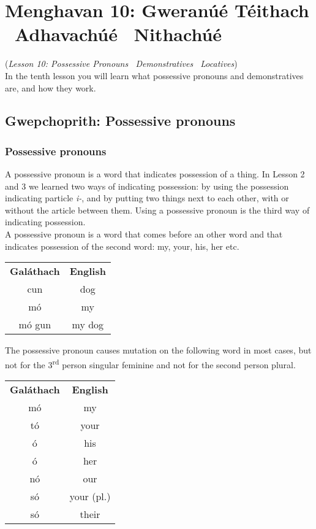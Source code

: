\section{Menghavan 10: Gweran\'{u}\'{e} T\'{e}ithach \textemdash\ Adhavach\'{u}\'{e} \textendash\ Nithach\'{u}\'{e}}
(\textit{Lesson 10: Possessive Pronouns \textemdash\ Demonstratives \textendash\ Locatives})\\

In the tenth lesson you will learn what possessive pronouns and demonstratives are, and how they work.

\subsection{Gwepchoprith: Possessive pronouns}
\subsubsection{Possessive pronouns}

A possessive pronoun is a word that indicates possession of a thing. In Lesson 2 and 3 we learned two ways of indicating possession: by using the possession indicating particle \textit{i-}, and by putting two things next to each other, with or without the article between them. Using a possessive pronoun is the third way of indicating possession.\\

A possessive pronoun is a word that comes before an other word and that indicates possession of the second word: my, your, his, her etc.
\begin{table}[H]
\centering
\begin{tabular}{cc}
  \toprule
  \textbf{Gal\'{a}thach} & \textbf{English}\\
  \cmidrule(lr){1-1}\cmidrule(lr){2-2}
  cun & dog\\
  m\'{o} & my\\
  m\'{o} gun & my dog\\
  \bottomrule
\end{tabular}
\label{examples_possessive_pronoun}
\end{table}

The possessive pronoun causes mutation on the following word in most cases, but not for the 3\textsuperscript{rd} person singular feminine and not for the second person plural.
\begin{table}[H]
\centering
\begin{tabular}{cc}
  \toprule
  \textbf{Gal\'{a}thach} & \textbf{English}\\
  \cmidrule(lr){1-1}\cmidrule(lr){2-2}
  m\'{o} & my\\
  t\'{o} & your\\
  \'{o} & his\\
  \'{o} & her\\
  n\'{o} & our\\
  s\'{o} & your (pl.)\\
  s\'{o} & their\\
  \bottomrule
\end{tabular}
\label{summary_possessive_pronoun}
\end{table}

